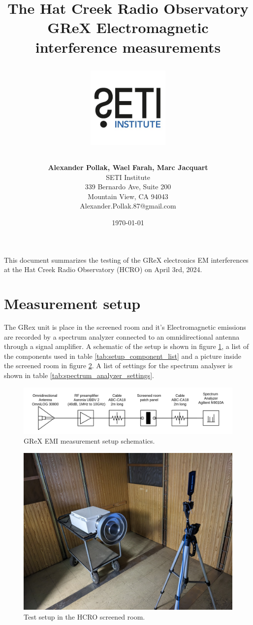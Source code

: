 \documentclass[12pt,a4paper,oneside]{article}
\title{\Huge The Hat Creek Radio Observatory\\
\vspace{0.5cm}
GReX Electromagnetic interference measurements\\
\vspace{0.5cm}
\normalsize \emph{}
\vspace{3.5cm}
\begin{center}
\includegraphics[height=4cm]{Figures/SETI_institute_logo.jpg}
\end{center}
}
\author{ 
\vspace{1cm}
\Large
\textbf{ Alexander Pollak, Wael Farah, Marc Jacquart} \\
SETI Institute \\ 
339 Bernardo Ave, Suite 200 \\
Mountain View, CA 94043 \\ 
Alexander.Pollak.87@gmail.com\\
}
\date{\today}
\begin{document}
\clearpage\maketitle
\thispagestyle{empty}

\newpage


This document summarizes the testing of the GReX electronics EM interferences at the Hat Creek Radio Observatory (HCRO) on April 3rd, 2024.

\section{Measurement setup}
\label{sec:Testing}

The GRex unit is place in the screened room and it's Electromagnetic emissions are recorded by a spectrum analyzer connected to an omnidirectional antenna through a signal amplifier. A schematic of the setup is shown in figure \ref{fig:measurement_setup_schematics}, a list of the components used in table \ref{tab:setup_component_list} and a picture inside the screened room in figure \ref{fig:screened_room_setup}. A list of settings for the spectrum analyser is shown in table \ref{tab:spectrum_analyzer_settings}.

\begin{figure}[H]
\centering
\includegraphics[width=1\linewidth]{Figures/measurement_setup_schematics.png}
\caption{GReX EMI measurement setup schematics.}
\label{fig:measurement_setup_schematics}
\end{figure}


\begin{figure}[H]
\centering
\includegraphics[width=0.8\linewidth]{Figures/screened_room_setup.jpeg}
\caption{Test setup in the HCRO screened room.}
\label{fig:screened_room_setup}
\end{figure}
\end{document}
